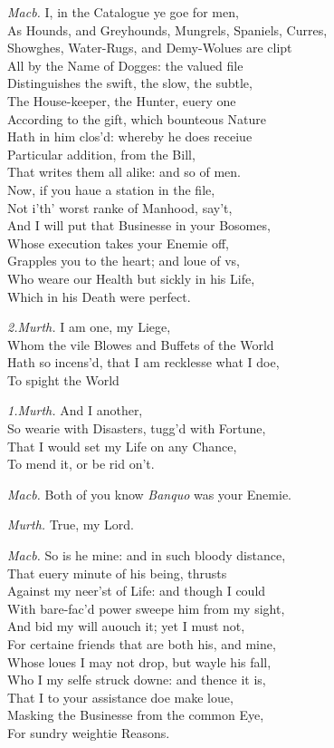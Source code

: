 \documentclass[12pt]{sides}
\newcommand{\dia}[1]{\hskip 15pt\textit{#1}\hskip 6pt}
\begin{document}
\begin{multicols}{2}
            \dia{Macb.} I, in the Catalogue ye goe for men, \\ As Hounds, and Greyhounds, Mungrels, Spaniels, Curres, \\ Showghes, Water-Rugs, and Demy-Wolues are clipt \\ All by the Name of Dogges: the valued file \\ Distinguishes the swift, the slow, the subtle, \\ The House-keeper, the Hunter, euery one \\ According to the gift, which bounteous Nature \\ Hath in him clos'd: whereby he does receiue \\ Particular addition, from the Bill, \\ That writes them all alike: and so of men. \\ Now, if you haue a station in the file, \\ Not i'th' worst ranke of Manhood, say't, \\ And I will put that Businesse in your Bosomes, \\ Whose execution takes your Enemie off, \\ Grapples you to the heart; and loue of vs, \\ Who weare our Health but sickly in his Life, \\ Which in his Death were perfect. %

            \dia{2.Murth.} I am one, my Liege, \\ Whom the vile Blowes and Buffets of the World \\ Hath so incens'd, that I am recklesse what I doe, \\ To spight the World

            \dia{1.Murth.} And I another, \\ So wearie with Disasters, tugg'd with Fortune, \\ That I would set my Life on any Chance, \\ To mend it, or be rid on't.

            \dia{Macb.} Both of you know \textit{Banquo} was your Enemie.

            \dia{Murth.} True, my Lord.

            \dia{Macb.} So is he mine: and in such bloody distance, \\ That euery minute of his being, thrusts \\ Against my neer'st of Life: and though I could \\ With bare-fac'd power sweepe him from my sight, \\ And bid my will auouch it; yet I must not, \\ For certaine friends that are both his, and mine, \\ Whose loues I may not drop, but wayle his fall, \\ Who I my selfe struck downe: and thence it is, \\ That I to your assistance doe make loue, \\ Masking the Businesse from the common Eye, \\ For sundry weightie Reasons.


\end{multicols}
\end{document}
